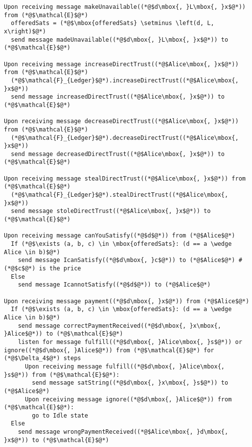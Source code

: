 \begin{lstlisting}[label=protocol, style=numbers]
Upon receiving message makeUnavailable((*@$d\mbox{, }L\mbox{, }x$@*)) from (*@$\mathcal{E}$@*)
  offeredSats = (*@$\mbox{offeredSats} \setminus \left(d, L, x\right)$@*)
  send message madeUnavailable((*@$d\mbox{, }L\mbox{, }x$@*)) to (*@$\mathcal{E}$@*)

Upon receiving message increaseDirectTrust((*@$Alice\mbox{, }x$@*)) from (*@$\mathcal{E}$@*)
  (*@$\mathcal{F}_{Ledger}$@*).increaseDirectTrust((*@$Alice\mbox{, }x$@*))
  send message increasedDirectTrust((*@$Alice\mbox{, }x$@*)) to (*@$\mathcal{E}$@*)

Upon receiving message decreaseDirectTrust((*@$Alice\mbox{, }x$@*)) from (*@$\mathcal{E}$@*)
  (*@$\mathcal{F}_{Ledger}$@*).decreaseDirectTrust((*@$Alice\mbox{, }x$@*))
  send message decreasedDirectTrust((*@$Alice\mbox{, }x$@*)) to (*@$\mathcal{E}$@*)

Upon receiving message stealDirectTrust((*@$Alice\mbox{, }x$@*)) from (*@$\mathcal{E}$@*)
  (*@$\mathcal{F}_{Ledger}$@*).stealDirectTrust((*@$Alice\mbox{, }x$@*))
  send message stoleDirectTrust((*@$Alice\mbox{, }x$@*)) to (*@$\mathcal{E}$@*)

Upon receiving message canYouSatisfy((*@$d$@*)) from (*@$Alice$@*)
  If (*@$\exists (a, b, c) \in \mbox{offeredSats}: (d == a \wedge Alice \in b)$@*)
    send message IcanSatisfy((*@$d\mbox{, }c$@*)) to (*@$Alice$@*) # (*@$c$@*) is the price
  Else
    send message IcannotSatisfy((*@$d$@*)) to (*@$Alice$@*)

Upon receiving message payment((*@$d\mbox{, }x$@*)) from (*@$Alice$@*)
  If (*@$\exists (a, b, c) \in \mbox{offeredSats}: (d == a \wedge Alice \in b)$@*)
    send message correctPaymentReceived((*@$d\mbox{, }x\mbox{, }Alice$@*)) to (*@$\mathcal{E}$@*)
    listen for message fulfill((*@$d\mbox{, }Alice\mbox{, }s$@*)) or ignore((*@$d\mbox{, }Alice$@*)) from (*@$\mathcal{E}$@*) for (*@$\Delta_4$@*) steps
      Upon receiving message fulfill((*@$d\mbox{, }Alice\mbox{, }s$@*)) from (*@$\mathcal{E}$@*):
        send message satString((*@$d\mbox{, }x\mbox{, }s$@*)) to (*@$Alice$@*)
      Upon receiving message ignore((*@$d\mbox{, }Alice$@*)) from (*@$\mathcal{E}$@*):
        go to Idle state
  Else
    send message wrongPaymentReceived((*@$Alice\mbox{, }d\mbox{, }x$@*)) to (*@$\mathcal{E}$@*)
\end{lstlisting}
